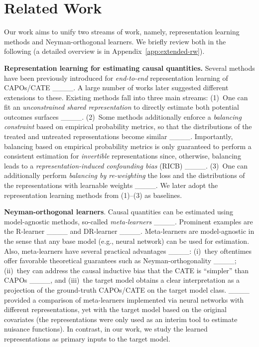 \section{Related Work}
\label{sec:related-work}

Our work aims to unify two streams of work, namely, representation learning methods and Neyman-orthogonal learners. We briefly review both in the following (a detailed overview is in Appendix~\ref{app:extended-rw}).


\textbf{Representation learning for estimating causal quantities.} Several methods have been previously introduced for \emph{end-to-end} representation learning of CAPOs/CATE  ____. A large number of works later suggested different extensions to these.
Existing methods fall into three main streams: (1)~One can fit an \emph{unconstrained shared representation} to directly estimate both potential outcomes surfaces ____. (2)~Some methods additionally enforce a \emph{balancing constraint} based on empirical probability metrics, so that the distributions of the treated and untreated representations become similar ____. Importantly, balancing based on empirical probability metrics is only guaranteed to perform a consistent estimation for \emph{invertible} representations since, otherwise, balancing leads to a \emph{representation-induced confounding bias} (RICB) ____. (3)~One can additionally perform \emph{balancing by re-weighting} the loss and the distributions of the representations with learnable weights ____. We later adopt the representation learning methods from (1)--(3) as baselines. 

\textbf{Neyman-orthogonal learners}. Causal quantities can be estimated using model-agnostic methods, so-called \emph{meta-learners} ____. Prominent examples are the R-learner ____ and DR-learner ____. %
Meta-learners are model-agnostic in the sense that any base model (e.g., neural network) can be used for estimation. Also, meta-learners have several practical advantages ____: (i)~they oftentimes offer favorable theoretical guarantees such as Neyman-orthogonality ____; (ii)~they can address the causal inductive bias that the CATE is ``simpler'' than CAPOs ____, and (iii)~the target model obtains a clear interpretation as a projection of the ground-truth CAPOs/CATE on the target model class. {____ provided a comparison of meta-learners implemented via neural networks with different representations, yet with the target model based on the original covariates (the representations were only used as an interim tool to estimate nuisance functions). In contrast, in our work, we study the learned representations as primary inputs to the target model.}


